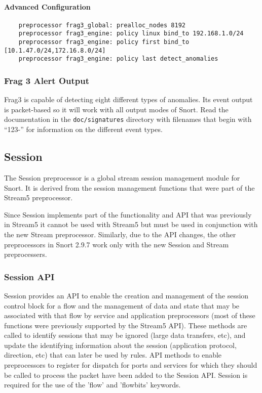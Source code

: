 \documentclass[english]{report}
\begin{document}
\paragraph{Advanced Configuration}
\begin{verbatim}
    preprocessor frag3_global: prealloc_nodes 8192 
    preprocessor frag3_engine: policy linux bind_to 192.168.1.0/24
    preprocessor frag3_engine: policy first bind_to [10.1.47.0/24,172.16.8.0/24]
    preprocessor frag3_engine: policy last detect_anomalies
\end{verbatim}

\subsubsection{Frag 3 Alert Output}
\label{frag3 alert output}

Frag3 is capable of detecting eight different types of anomalies.  Its event
output is packet-based so it will work with all output modes of Snort.  Read
the documentation in the \texttt{doc/signatures} directory with filenames that
begin with ``123-'' for information on the different event types.


\subsection{Session}
\label{session section}

The Session preprocessor is a global stream session management module
for Snort.  It is derived from the session management functions that
were part of the Stream5 preprocessor.

Since Session implements part of the functionality and API that was
previously in Stream5 it cannot be used with Stream5 but must be
used in conjunction with the new Stream preprocessor.  Similarly, 
due to the API changes, the other preprocessors in Snort 2.9.7 work
only with the new Session and Stream preprocessers.

\subsubsection{Session API}

Session provides an API to enable the creation and management of
the session control block for a flow and the management of data
and state that may be associated with that flow by service and
application preprocessors (most of these functions were previously
supported by the Stream5 API). These methods are called to identify
sessions that may be ignored (large data transfers, etc), and 
update the identifying information about the session (application
protocol, direction, etc) that can later be used by rules.  
API methods to enable preprocessors to register for dispatch for
ports and services for which they should be called to process 
the packet have been added to the Session API. Session is required
for the use of the 'flow' and 'flowbits' keywords.
\end{document}
